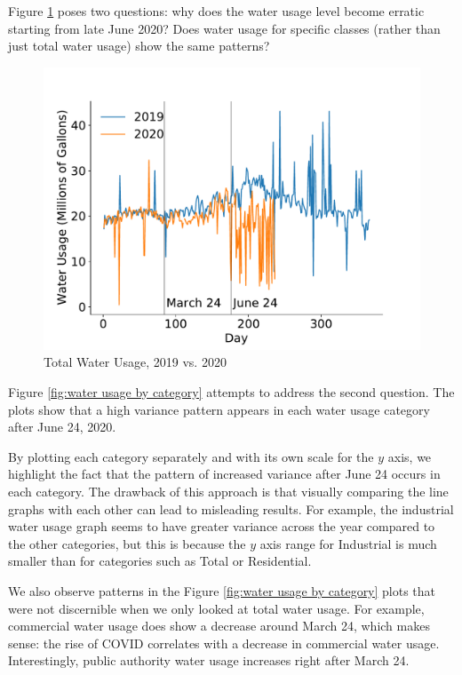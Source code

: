 \documentclass[twocolumn]{article}
\begin{document}
Figure \ref{fig:total_usage} poses two questions: why does the water usage level become erratic starting from late June 2020? Does water usage for specific classes (rather than just total water usage) show the same patterns?

\begin{figure}[H]
    \includegraphics[width=\columnwidth]{Bryan/total_water_usage_new.pdf}
    \caption{Total Water Usage, 2019 vs. 2020}
    \label{fig:total_usage}
\end{figure}

Figure \ref{fig:water usage by category} attempts to address the second question. The plots show that a high variance pattern appears in each water usage category after June 24, 2020. 

By plotting each category separately and with its own scale for the $y$ axis, we highlight the fact that the pattern of increased variance after June 24 occurs in each category. The drawback of this approach is that visually comparing the line graphs with each other can lead to misleading results. For example, the industrial water usage graph seems to have greater variance across the year compared to the other categories, but this is because the $y$ axis range for Industrial is much smaller than for categories such as Total or Residential. 

We also observe patterns in the Figure \ref{fig:water usage by category} plots that were not discernible when we only looked at total water usage. For example, commercial water usage does show a decrease around March 24, which makes sense: the rise of COVID correlates with a decrease in commercial water usage. Interestingly, public authority water usage increases right after March 24. 
\end{document}

